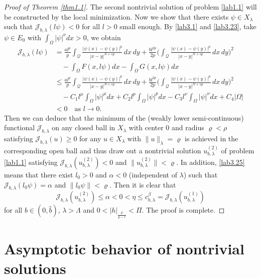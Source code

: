 \documentclass[reqno]{amsart}
\begin{document}
\begin{proof}[Proof of Theorem \ref{thm1.1}]
The second nontrivial solution of problem \eqref{lab1.1} will be constructed by the 
local minimization. Now we show that there exists $\psi \in X_\lambda$ such that 
$\mathcal{J}_{b,\lambda}(l \psi)<0$ for all $l>0$ small enough. By \eqref{lab3.1} 
and \eqref{lab3.23}, take $\psi\in E_0$ with $\int_\Omega |\psi|^\nu dx>0$, 
we obtain 
\begin{equation}\label{lab3.25}
\begin{split}
 \mathcal{J}_{b,\lambda}(l\psi)
&= \frac{al^p}{p}\int_\mathcal{Q}\frac{|\psi(x)-\psi(y)|^p}{|x-y|^{N+sp}}\,dx\,dy
+\frac{bl^{2p}}{2p}\Big(\int_\mathcal{Q}\frac{|\psi(x)-\psi(y)|^p}{|x-y|^{N+sp}}\,dx\,dy\Big)^2 \\
&\quad -\int_\Omega F(x, l\psi)dx-\int_\Omega G(x, l\psi)dx \\
&\leq  \frac{al^p}{p}\int_{\mathcal{Q}}\frac{|\psi(x)-\psi(y)|^p}{|x-y|^{N+sp}}\,dx\,dy
+\frac{bl^{2p}}{2p}\Big(\int_\mathcal{Q}\frac{|\psi(x)-\psi(y)|^p}{|x-y|^{N+sp}}\,dx\,dy
 \Big)^2 \\
&\quad -C_1l^\mu\int_{\Omega}|\psi|^\mu dx+C_2l^p\int_{\Omega}|\psi|^pdx-C_3l^\nu\int_{\Omega}|\psi|^\nu dx+C_4|\Omega|  \\
&<0\quad \text{as } l\to 0.
\end{split}
\end{equation}
Then we can deduce that the minimum of the (weakly lower semi-continuous) functional 
$\mathcal{J}_{b,\lambda}$ on any closed ball in $X_\lambda$ with center 0 and radius 
$\varrho<\rho$ satisfying $\mathcal{J}_{b,\lambda}(u)\geq0$ for any $u\in X_\lambda$ 
with $\|u\|_\lambda=\varrho$ is achieved in the corresponding open ball and thus draw 
out a nontrivial solution $u^{(2)}_{b,\lambda}$ of problem \eqref{lab1.1} satisfying 
$\mathcal{J}_{b,\lambda}(u^{(2)}_{b,\lambda})<0$ and $\|u^{(2)}_{b,\lambda}\|<\varrho$. 
In addition, \eqref{lab3.25} means that there exist $l_0>0$ and $\alpha<0$ 
(independent of $\lambda$) such that $\mathcal{J}_{b,\lambda}(l_0 \psi)=\alpha$ and 
$\|l_0 \psi\|<\varrho$. Then it is clear that
\begin{equation}\label{lab3.26}
 \mathcal{J}_{b,\lambda}(u^{(2)}_{b,\lambda})
 \leq\alpha<0<\eta\leq c_{b,\lambda}^\beta=\mathcal{J}_{b,\lambda}(u^{(1)}_{b,\lambda})
\end{equation}
for all $b\in(0, \widehat{b})$, $\lambda>\Lambda$ and $0<|h|_{\frac{p}{p-r}}<\Pi$. 
The proof is complete.
\end{proof}

\section{Asymptotic behavior of nontrivial solutions}
\end{document}
